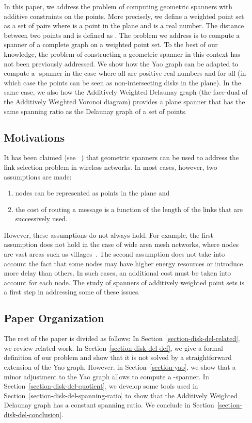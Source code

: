 \documentclass[pdftex,leqno,fleqn,12pt]{article}
\begin{document}
In this paper, we address the problem of computing geometric spanners with
additive constraints on the points. More precisely, we define a weighted
point set as a set of pairs  where  is a point in the plane and
 is a real number. The distance between two points  and
 is defined as . The problem we address is to
compute a spanner of a complete graph on a weighted point set. To the best
of our knowledge, the problem of constructing a geometric spanner in this
context has not been previously addressed. We show how the Yao graph can be
adapted to compute a -spanner in the case where all  are
positive real numbers and  for all  (in which
case the points can be seen as non-intersecting disks in the plane). In the
same case, we also how the Additively Weighted Delaunay graph (the face-dual
of the Additively Weighted Voronoi diagram) provides a plane spanner that
has the same spanning ratio as the Delaunay graph of a set of points.

\subsection{Motivations}

It has been claimed (see ~\cite{alzoubi03,schindelhauer04,schindelhauer07})
that geometric spanners can be used to address the link selection problem in
wireless networks. In most cases, however, two assumptions are made:
\begin{enumerate}
\item nodes can be represented as points in the plane and
\item the cost of routing a message is a function of the length of the links
that are successively used.
\end{enumerate}
However, these assumptions do
not always hold. For example, the first assumption does not hold in the case
of wide area mesh networks, where nodes are vast areas such as
villages~\cite{raman04}.  The second assumption does not take into account
the fact that some nodes may have higher energy resources or introduce more
delay than others. In such cases, an additional cost must be taken into
account for each node. The study of spanners of additively weighted
point sets is a first step in addressing some of these issues.

\subsection{Paper Organization}

The rest of the paper is divided as follows: In Section~\ref{section-disk-del-related}, we review
related work. In Section~\ref{section-disk-del-def}, we give a formal definition of our problem and
show that it is not solved by a straightforward extension of the Yao graph. However, in
Section~\ref{section-yao}, we show that a minor adjustment to the Yao graph allows to compute a
-spanner. In Section~\ref{section-disk-del-quotient}, we develop some tools used in
Section~\ref{section-disk-del-spanning-ratio} to show that the Additively Weighted Delaunay graph
has a constant spanning ratio. We conclude in Section~\ref{section-disk-del-conclusion}.
\end{document}
